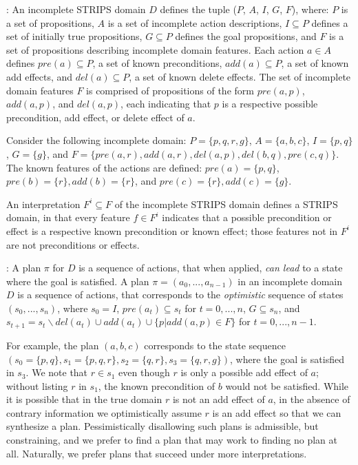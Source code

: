 \documentclass{article}
\def\und#1{\noindent{\bf #1}:}
\begin{document}
\und{Incomplete STRIPS Domains} An incomplete STRIPS domain ${D}$  defines the
tuple ($P$, ${A}$, $I$, $G$, $F$), where: $P$ is a  set of propositions, ${A}$
is a set of incomplete  action descriptions, $I \subseteq P$ defines a set of
initially true  propositions, $G \subseteq P$ defines the goal propositions, and
$F$ is a set of propositions describing incomplete domain features. Each action
${a} \in {A}$ defines $pre({a}) \subseteq P$, a set of known preconditions,
$add({a}) \subseteq P$, a set of known add  effects, and $del({a}) \subseteq P$,
a set of known delete effects.   The set of incomplete domain features $F$ is
comprised of propositions of the form $pre({a}, p)$, $add({a}, p)$, and
$del({a}, p)$, each indicating that $p$ is a respective possible precondition, add effect, or
delete effect of $a$.

Consider the following incomplete domain: $P = \{p, q, r, g\}$, ${A} =
\{{a}, {b}, {c}\}$, $I = \{p, q\}$,  $G= \{g\}$, and $F = \{pre(a, r), add(a, r),
del(a, p),del(b, q),pre(c, q) \}$.  The
known features of the actions are defined:  $pre({a}) = \{p, q\}$, $  pre({b}) =
\{r\},  add({b}) = \{r\}$, and  $ pre({c}) =
\{r\},  add({c}) = \{g\}$. 

An interpretation $F^i \subseteq F$ of the incomplete STRIPS domain
defines a STRIPS domain, in that every feature $f \in F^i$
indicates that a possible precondition or effect is a respective known
precondition or known effect; those features not in $F^i$ are
not preconditions or effects.   



\und{Incomplete STRIPS Plans} A plan $\pi$ for ${D}$ is a sequence of
actions, that when applied, {\em can lead} to a state where the goal is
satisfied.  A plan $\pi = ({a}_0,  ..., {a}_{n-1})$ in an incomplete
domain ${D}$ is a sequence of  actions, that corresponds to the {\em
optimistic} sequence of states $(s_0, ...,  s_n)$, where $s_0 = I$,
$pre({a}_t) \subseteq s_t$ for $t = 0,...,  n$, $G \subseteq s_n$,
and $s_{t+1} = s_t \backslash del({a}_t)  \cup
add({a}_t) \cup \{p | add(a, p) \in
F\}$ for $t = 0,...,
n-1$.

For example, the plan $({a}, {b}, {c})$ corresponds to the
state sequence $(s_0 = \{p, q\}, s_1 = \{p, q, r\}, s_2 = \{q, r\}, s_3 = \{q,
r, g\})$, where the goal is satisfied in $s_3$.  We note that $r \in s_1$ even
though $r$ is only a possible add effect of $a$; without listing $r$ in $s_1$,
the known precondition of $b$ would not be satisfied.  While it is possible that
in the true domain $r$ is not an add effect of $a$, in the absence of contrary
information we optimistically assume $r$ is an add effect so that we can
synthesize a plan.   Pessimistically disallowing such plans is admissible, but
constraining, and we prefer to find a plan that may work to finding no plan at
all.  Naturally, we prefer plans that succeed under more interpretations.
\end{document}

